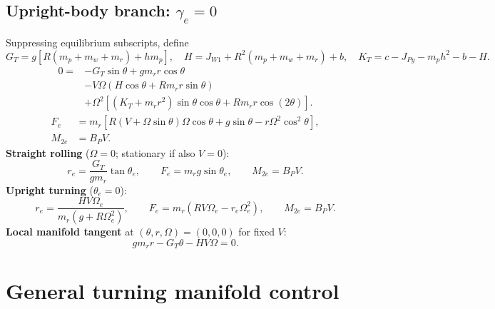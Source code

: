 \documentclass[10pt]{article}
\numberwithin{equation}{section}
\begin{document}
\subsection*{Upright-body branch: $\gamma_e=0$}
Suppressing equilibrium subscripts, define
\begin{equation}
G_T=g[R(m_p+m_w+m_r)+hm_p],\quad
H=J_{W1}+R^2(m_p+m_w+m_r)+b,\quad
K_T=c-J_{Py}-m_ph^2-b-H.
\end{equation}
\begin{equation}
\begin{aligned}
0={}&-G_T\sin\theta+gm_r r\cos\theta\\
&-V\Omega(H\cos\theta+Rm_r r\sin\theta)\\
&+\Omega^2[(K_T+m_r r^2)\sin\theta\cos\theta+Rm_r r\cos(2\theta)].
\end{aligned}
\end{equation}
\begin{equation}
\begin{aligned}
F_e&=m_r[R(V+\Omega\sin\theta)\Omega\cos\theta+g\sin\theta-r\Omega^2\cos^2\theta],\\
M_{2e}&=B_PV.
\end{aligned}
\end{equation}
\textbf{Straight rolling} ($\Omega=0$; stationary if also $V=0$):
\begin{equation}
\boxed{r_e=\frac{G_T}{gm_r}\tan\theta_e,\qquad
F_e=m_rg\sin\theta_e,\qquad M_{2e}=B_PV.}
\end{equation}
\textbf{Upright turning} ($\theta_e=0$):
\begin{equation}
\boxed{r_e=\frac{HV\Omega_e}{m_r(g+R\Omega_e^2)},\qquad
F_e=m_r(RV\Omega_e-r_e\Omega_e^2),\qquad M_{2e}=B_PV.}
\end{equation}
\textbf{Local manifold tangent} at $(\theta,r,\Omega)=(0,0,0)$ for fixed $V$:
\begin{equation}
gm_r r-G_T\theta-HV\Omega=0.
\end{equation}


\section{General turning manifold control}
\end{document}
